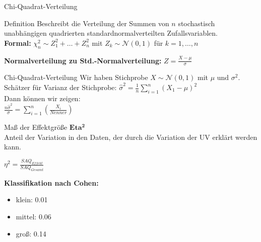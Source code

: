 \documentclass{beamer}
\begin{document}
	\begin{frame}{Chi-Quadrat-Verteilung}
		\begin{block}{Definition}
			Beschreibt die Verteilung der Summen von $n$ stochastisch unabhängigen quadrierten standardnormalverteilten Zufallsvariablen. \\ \vspace{2 ex}
			\textbf{Formal:} $\chi_n^2 \sim Z_1^2+ \dots + Z_n^2 $ mit $Z_k \sim \mathcal{N}(0,1)$ für $k=1, \dots , n$
		\end{block}
			\textbf{Normalverteilung zu Std.-Normalverteilung:} $Z = \frac{X-\mu}{\sigma}$ 
	\end{frame}
	
	\begin{frame}{Chi-Quadrat-Verteilung}
		Wir haben Stichprobe $X\sim \mathcal{N}(0,1)$ mit $\mu$ und $\sigma^2$.\\ \vspace{1ex} 
		Schätzer für Varianz der Stichprobe: $\hat{\sigma}^2 = \frac{1}{n} \sum_{i=1}^{n}(X_1-\mu)^2$ \\ \vspace{2ex}
		Dann können wir zeigen: \\
		$\frac{n\hat{\sigma}^2}{\sigma} = \sum_{i=1}^{n}(\frac{X_i}{Nenner})$
	\end{frame}
	
	\begin{frame}{Maß der Effektgröße}
		$\mathbf{Eta^2}$\\
		Anteil der Variation in den Daten, der durch die Variation der UV erklärt werden kann.\\
		\begin{center}
			$\eta^2 = \frac{SAQ_{Effekt}}{SAQ_{Gesamt}}$ 
		\end{center}
		\textbf{Klassifikation nach Cohen:}
		\begin{itemize}
			\item klein: 0.01
			\item mittel: 0.06
			\item groß: 0.14
		\end{itemize}
		
	\end{frame}
	
\end{document}
